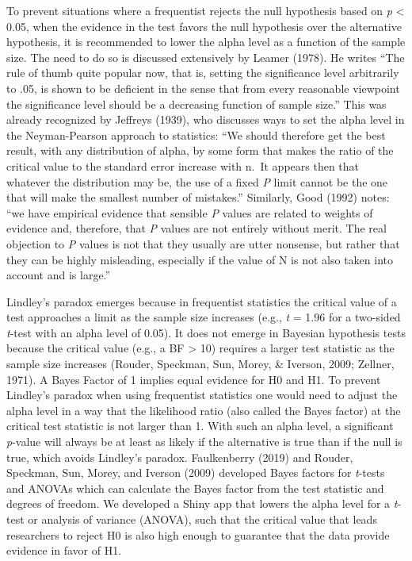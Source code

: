 \documentclass[
  english,
  ,jou, a4paper,floatsintext]{apa6}
\begin{document}
To prevent situations where a frequentist rejects the null hypothesis based on \emph{p} \textless{} 0.05, when the evidence in the test favors the null hypothesis over the alternative hypothesis, it is recommended to lower the alpha level as a function of the sample size. The need to do so is discussed extensively by Leamer (1978). He writes ``The rule of thumb quite popular now, that is, setting the significance level arbitrarily to .05, is shown to be deficient in the sense that from every reasonable viewpoint the significance level should be a decreasing function of sample size.'' This was already recognized by Jeffreys (1939), who discusses ways to set the alpha level in the Neyman-Pearson approach to statistics: ``We should therefore get the best result, with any distribution of alpha, by some form that makes the ratio of the critical value to the standard error increase with n.~It appears then that whatever the distribution may be, the use of a fixed \emph{P} limit cannot be the one that will make the smallest number of mistakes.'' Similarly, Good (1992) notes: ``we have empirical evidence that sensible \emph{P} values are related to weights of evidence and, therefore, that \emph{P} values are not entirely without merit. The real objection to \emph{P} values is not that they usually are utter nonsense, but rather that they can be highly misleading, especially if the value of N is not also taken into account and is large.''

Lindley's paradox emerges because in frequentist statistics the critical value of a test approaches a limit as the sample size increases (e.g., \emph{t} = 1.96 for a two-sided \emph{t}-test with an alpha level of 0.05). It does not emerge in Bayesian hypothesis tests because the critical value (e.g., a BF \textgreater{} 10) requires a larger test statistic as the sample size increases (Rouder, Speckman, Sun, Morey, \& Iverson, 2009; Zellner, 1971). A Bayes Factor of 1 implies equal evidence for H0 and H1. To prevent Lindley's paradox when using frequentist statistics one would need to adjust the alpha level in a way that the likelihood ratio (also called the Bayes factor) at the critical test statistic is not larger than 1. With such an alpha level, a significant \emph{p}-value will always be at least as likely if the alternative is true than if the null is true, which avoids Lindley's paradox. Faulkenberry (2019) and Rouder, Speckman, Sun, Morey, and Iverson (2009) developed Bayes factors for \emph{t}-tests and ANOVAs which can calculate the Bayes factor from the test statistic and degrees of freedom. We developed a Shiny app that lowers the alpha level for a \emph{t}-test or analysis of variance (ANOVA), such that the critical value that leads researchers to reject H0 is also high enough to guarantee that the data provide evidence in favor of H1.
\end{document}
